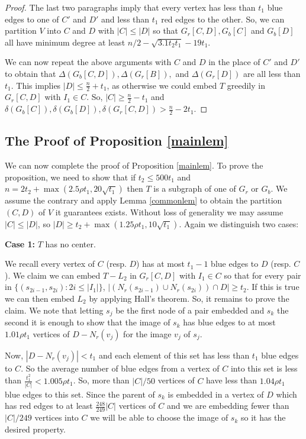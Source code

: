 \documentclass[11pt]{article}
\begin{document}
\begin{proof}
The last two paragraphs imply that every vertex has less than  $t_1$ blue edges to one of $C'$ 
and $D'$ and less than  $t_1$ red edges to the other. 
So, we can partition $V$ into $C$ and $D$ with $|C| \le |D|$ so that $G_r[C,D], G_b[C]$ and $G_b[D]$ all have minimum  degree at least  $n/2-\sqrt{3.1t_2t_1}-19t_1$.

We can now repeat the above arguments with $C$ and $D$ in the place of $C '$ and $D'$ to obtain that 
  $\Delta(G_b[C,D]), \Delta(G_r[B]),$ and $\Delta(G_r[D])$ are all less than $t_1$.  This implies $|D| \le \frac{n}{2}+t_1$, as otherwise we could embed $T$ greedily in $G_r[C,D]$ with $I_1 \in C$. So, $|C| \ge \frac{n}{2}-t_1$
and $\delta(G_b[C]), \delta(G_b[D]), \delta(G_r[C,D]) > \frac{n}{2}-2t_1$. 
\end{proof}

\subsection{The Proof of Proposition \ref{mainlem}}
We can now complete the proof of Proposition \ref{mainlem}.
To prove the proposition, we need to show that if   $t_2 \le 500t_1$ and $n=2t_2 + \max(2.5\rho t_1, 20\sqrt{t_1})$  then $T$ is a subgraph of one of $G_r$ or $G_b$.  
We assume the contrary and apply Lemma \ref{commonlem}  to obtain the partition $(C,D)$ of $V$ it guarantees exists. Without loss of generality we may assume $|C| \le |D|$, 
 so $|D| \ge t_2+ \max(1.25 \rho t_1, 10 \sqrt{t_1})$.
Again we distinguish two cases: 

{\bf Case 1: } $T$ has no center. 



We recall  every vertex of $C$ (resp. $D$) has at most $t_1-1$ blue edges to $D$ (resp. $C$).
We claim we can embed $T-L_2$ in $G_r[C,D]$ with $I_1 \in C$ so that for every pair  in $\{(s_{2i-1},s_{2i}) : 2i \le |I_1|\}$,
$|(N_r(s_{2i-1}) \cup N_r(s_{2i})) \cap D| \ge t_2$. If this is true we can then embed $L_2$ by applying Hall's theorem.
So, it remains to prove the claim. We note that letting $s_j$ be the first node  of a pair embedded and $s_k$
the second it is enough to show that  the image  of $s_k$ has blue edges to at most $1.01\rho t_1$ vertices of $D-N_r(v_j)$
for the image $v_j$ of $s_j$. 

Now, $|D-N_r(v_j)| <t_1$ and each element of this set has less than $t_1$ blue edges to $C$. So the average number of blue edges from  a vertex of $C$ into this set is less than $\frac{t_1^2}{|C|}< 1.005\rho t_1$. So, more than $|C|/50$ vertices of 
$C$ have less than $1.04\rho t_1$ blue edges to this set. Since the parent of $s_k$ is embedded in a vertex of $D$ 
which has red edges to at least $\frac{248}{249}|C|$ vertices  of  $C$ and we are  embedding fewer than  $|C|/249$ vertices into $C$ we will be able to choose 
the image of $s_k$  so it has the desired property. 
\end{document}
